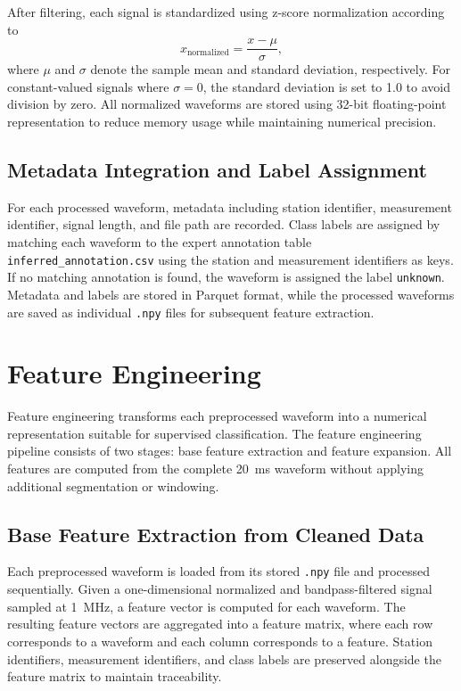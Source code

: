 After filtering, each signal is standardized using z-score normalization according to
\begin{equation}
x_{\mathrm{normalized}} = \frac{x - \mu}{\sigma},
\end{equation}
where $\mu$ and $\sigma$ denote the sample mean and standard deviation, respectively. For constant-valued signals where $\sigma = 0$, the standard deviation is set to 1.0 to avoid division by zero. All normalized waveforms are stored using 32-bit floating-point representation to reduce memory usage while maintaining numerical precision.

\subsection{Metadata Integration and Label Assignment}

For each processed waveform, metadata including station identifier, measurement identifier, signal length, and file path are recorded. Class labels are assigned by matching each waveform to the expert annotation table \texttt{inferred\_annotation.csv} using the station and measurement identifiers as keys. If no matching annotation is found, the waveform is assigned the label \texttt{unknown}. Metadata and labels are stored in Parquet format, while the processed waveforms are saved as individual \texttt{.npy} files for subsequent feature extraction.

\section{Feature Engineering}

Feature engineering transforms each preprocessed waveform into a numerical representation suitable for supervised classification. The feature engineering pipeline consists of two stages: base feature extraction and feature expansion. All features are computed from the complete 20~ms waveform without applying additional segmentation or windowing.

\subsection{Base Feature Extraction from Cleaned Data}

Each preprocessed waveform is loaded from its stored \texttt{.npy} file and processed sequentially. Given a one-dimensional normalized and bandpass-filtered signal sampled at 1~MHz, a feature vector is computed for each waveform. The resulting feature vectors are aggregated into a feature matrix, where each row corresponds to a waveform and each column corresponds to a feature. Station identifiers, measurement identifiers, and class labels are preserved alongside the feature matrix to maintain traceability.

